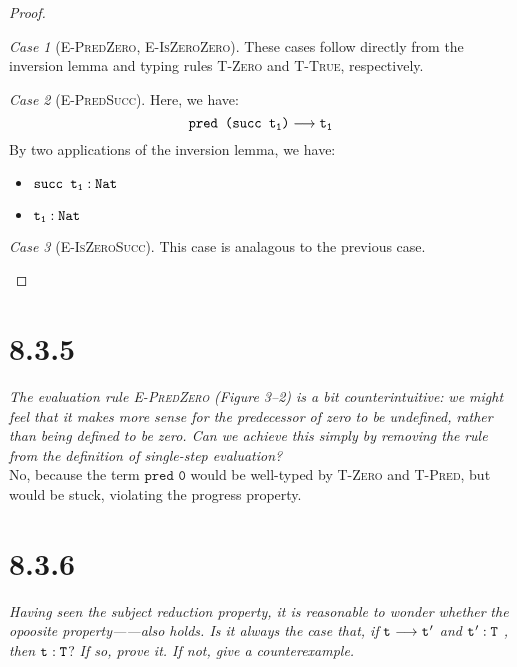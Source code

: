 \documentclass{article}
\newcommand{\term}[1]{\texttt{t\textsubscript{#1}}}
\renewcommand{\ss}[2]{#1 \longrightarrow #2}
\newcommand{\ms}[1]{\texttt{#1}}
\theoremstyle{remark}
\newtheorem*{case}{Case}
\begin{document}
\begin{proof}
        \begin{case}[\textsc{E-PredZero}, \textsc{E-IsZeroZero}]
            These cases follow directly from the inversion lemma and typing
            rules \textsc{T-Zero} and \textsc{T-True}, respectively.
        \end{case}

        \begin{case}[\textsc{E-PredSucc}]
            Here, we have:
            $$\ss{\ms{pred (succ \term{1})}}{\term{1}}$$
            By two applications of the inversion lemma, we have:
            \begin{itemize}
                \item $\ms{succ \term{1}} : \ms{Nat}$
                \item $\ms{\term{1}} : \ms{Nat}$
            \end{itemize}
        \end{case}
        \begin{case}[\textsc{E-IsZeroSucc}]
            This case is analagous to the previous case.
        \end{case}

    \end{proof}

\section{8.3.5}

    \textit{The evaluation rule \textsc{E-PredZero} (Figure 3--2) is a bit counterintuitive:}
    \textit{we might feel that it makes more sense for the predecessor of zero to be undefined,}
    \textit{rather than being defined to be zero. Can we achieve this simply by removing the}
    \textit{rule from the definition of single-step evaluation?} \\

    No, because the term $\ms{pred 0}$ would be well-typed by \textsc{T-Zero} and \textsc{T-Pred},
    but would be stuck, violating the progress property.

\section{8.3.6}

    \textit{Having seen the subject reduction property, it is reasonable to wonder whether}
    \textit{the opoosite property------also holds. Is it always the}
    \textit{case that, if} $\ss{\term{}}{\term{}'}$ \textit{and} $\term{}' : \ms{T}$ \textit{, then}
    $\term{} : \ms{T}$? \textit{If so, prove it. If not, give a counterexample.} \\
\end{document}
